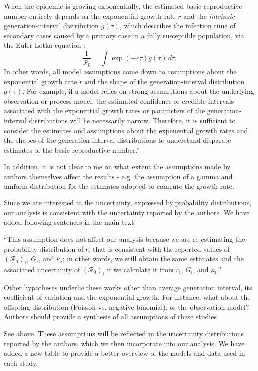 \documentclass[12pt]{article}
\newcommand{\Ro}{\ensuremath{{\mathcal R}_{0}}\xspace}
\newcommand{\revtext}{\textsf}
\begin{document}
When the epidemic is growing exponentially, the estimated basic reproductive number entirely depends on the exponential growth rate $r$ and the \emph{intrinsic} generation-interval distribution $g(\tau)$, which describes the infection time of secondary cases caused by a primary case in a fully susceptible population, via the Euler-Lotka equation \citep{wallinga2007generation}:
\begin{equation}
\frac{1}{\Ro} = \int \exp(-r\tau) g(\tau) \, d\tau.
\label{eq:euler}
\end{equation}
In other words, all model assumptions come down to assumptions about the exponential growth rate $r$ and the shape of the generation-interval distribution $g(\tau)$.
For example, if a model relies on strong assumptions about the underlying observation or process model, the estimated confidence or credible intervals associated with the exponential growth rates or parameters of the generation-interval distributions will be necessarily narrow.
Therefore, it is sufficient to consider the estimates and assumptions about the exponential growth rates and the shapes of the generation-interval distributions to understand disparate estimates of the basic reproductive number.''

\revtext{In addition, it is not clear to me on what extent the assumptions made by authors themselves affect the results - e.g. the assumption of a gamma and uniform distribution for the estimates adopted to compute the growth rate.}

Since we are interested in the uncertainty, expressed by probability distributions, our analysis is consistent with the uncertainty reported by the authors. We have added following sentences in the main text:

``This assumption does not affect our analysis because we are re-estimating the probability distribution of $r_i$ that is consistent with the reported values of $(\Ro)_i$, $\bar G_i$, and $\kappa_i$;
in other words, we still obtain the same estimates and the associated uncertainty of $(\Ro)_i$ if we calculate it from $r_i$, $\bar G_i$, and $\kappa_i$.''

\revtext{Other hypotheses underlie these works other than average generation interval, its coefficient of variation and the exponential growth. For instance, what about the offspring distribution (Poisson vs. negative binomial), or the observation model? Authors should provide a synthesis of all assumptions of these studies}

See above. These assumptions will be reflected in the uncertainty distributions reported by the authors, which we then incorporate into our analysis. We have added a new table to provide a better overview of the models and data used in each study.
\end{document}
